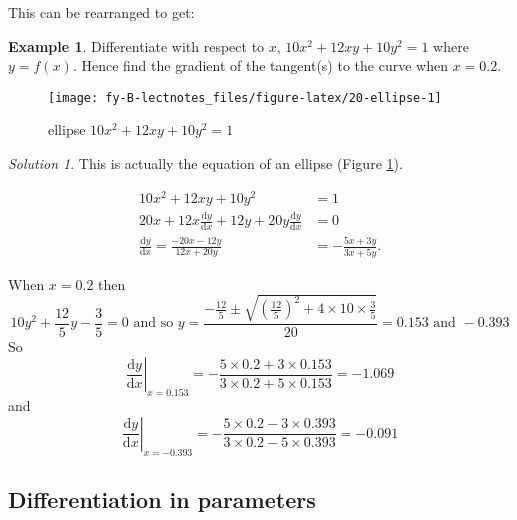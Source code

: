 \documentclass[
  english,
  11pt,
  oneside]{book}
\newcommand{\slide}{}
\theoremstyle{definition}
\theoremstyle{definition}
\newtheorem{example}{Example}[chapter]
\theoremstyle{definition}
\theoremstyle{definition}
\theoremstyle{remark}
\newtheorem*{solution}{Solution}
\begin{document}
\begin{slidesonly}

\slide

This can be rearranged to get:

\end{slidesonly}

\slide

\begin{example}
Differentiate with respect to \(x\), \(10x^2 + 12xy + 10y^2 = 1\) where \(y = f(x)\). Hence find the gradient of the tangent(s) to the curve when \(x=0.2\).
\end{example}

\begin{figure}

{\centering \texttt{[image: fy-B-lectnotes\_files/figure-latex/20-ellipse-1]} 

}

\caption{ellipse $10x^2 + 12xy + 10y^2 = 1$}\label{fig:20-ellipse}
\end{figure}

\begin{solution}
This is actually the equation of an ellipse (Figure \ref{fig:20-ellipse}).

\begin{align*}
10x^2 + 12xy + 10y^2 &= 1\\
20x+12x\frac{\mathrm{d} y}{\mathrm{d} x}+12y+20y\frac{\mathrm{d} y}{\mathrm{d} x} &=0\\
\frac{\mathrm{d} y}{\mathrm{d} x} = \frac{-20x-12y}{12x+20y} &= -\frac{5x+3y}{3x+5y}.
\end{align*}

When \(x=0.2\) then
\[
10y^2+\frac{12}5y-\frac35=0\text{ and so }y = \frac{-\frac{12}5\pm\sqrt{\left(\frac{12}5\right)^2+4\times10\times\frac35}}{20} = 0.153\text{ and }-0.393
\]
So
\[
\left.\frac{\mathrm{d} y}{\mathrm{d} x}\right|_{x=0.153} = -\frac{5\times0.2+3\times 0.153}{3\times0.2+5\times0.153} = -1.069
\]
and
\[
\left.\frac{\mathrm{d} y}{\mathrm{d} x}\right|_{x=-0.393} = -\frac{5\times0.2-3\times 0.393}{3\times0.2-5\times0.393} = -0.091
\]
\end{solution}

\slide

\begin{slidesonly}

\phantom{a}
\slide

\end{slidesonly}

\subsection{Differentiation in parameters}\label{differentiation-in-parameters}
\end{document}
